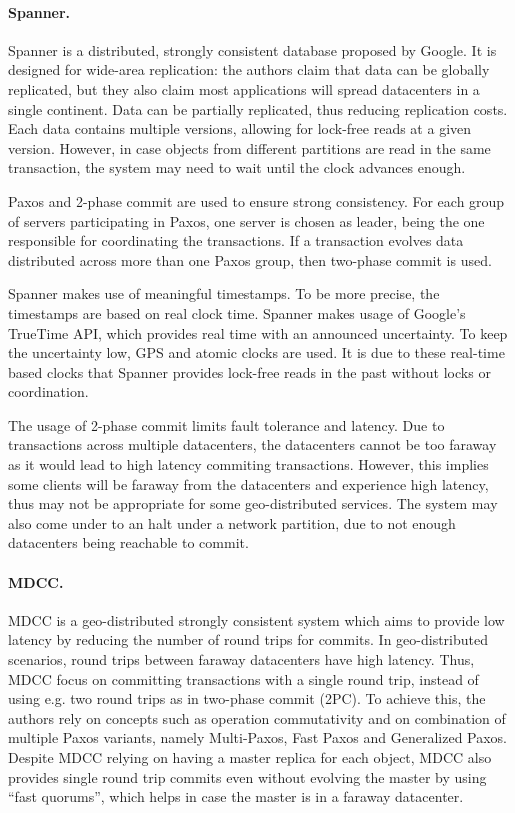 
\paragraph{Spanner.} Spanner \cite{spanner} is a distributed, strongly consistent database proposed by Google.
It is designed for wide-area replication: the authors claim that data can be globally replicated, but they also claim most applications will spread datacenters in a single continent.
Data can be partially replicated, thus reducing replication costs.
Each data contains multiple versions, allowing for lock-free reads at a given version.
However, in case objects from different partitions are read in the same transaction, the system may need to wait until the clock advances enough.

Paxos and 2-phase commit are used to ensure strong consistency.
For each group of servers participating in Paxos, one server is chosen as leader, being the one responsible for coordinating the transactions.
If a transaction evolves data distributed across more than one Paxos group, then two-phase commit is used.

Spanner makes use of meaningful timestamps.
To be more precise, the timestamps are based on real clock time.
Spanner makes usage of Google's TrueTime API, which provides real time with an announced uncertainty.
To keep the uncertainty low, GPS and atomic clocks are used.
It is due to these real-time based clocks that Spanner provides lock-free reads in the past without locks or coordination.

The usage of 2-phase commit limits fault tolerance and latency.
Due to transactions across multiple datacenters, the datacenters cannot be too faraway as it would lead to high latency commiting transactions.
However, this implies some clients will be faraway from the datacenters and experience high latency, thus may not be appropriate for some geo-distributed services.
The system may also come under to an halt under a network partition, due to not enough datacenters being reachable to commit.

\paragraph{MDCC.} MDCC \cite{mdcc} is a geo-distributed strongly consistent system which aims to provide low latency by reducing the number of round trips for commits.
In geo-distributed scenarios, round trips between faraway datacenters have high latency.
Thus, MDCC focus on committing transactions with a single round trip, instead of using e.g. two round trips as in two-phase commit (2PC).
To achieve this, the authors rely on concepts such as operation commutativity and on combination of multiple Paxos variants, namely Multi-Paxos, Fast Paxos and Generalized Paxos.
Despite MDCC relying on having a master replica for each object, MDCC also provides single round trip commits even without evolving the master by using ``fast quorums'', which helps in case the master is in a faraway datacenter.

